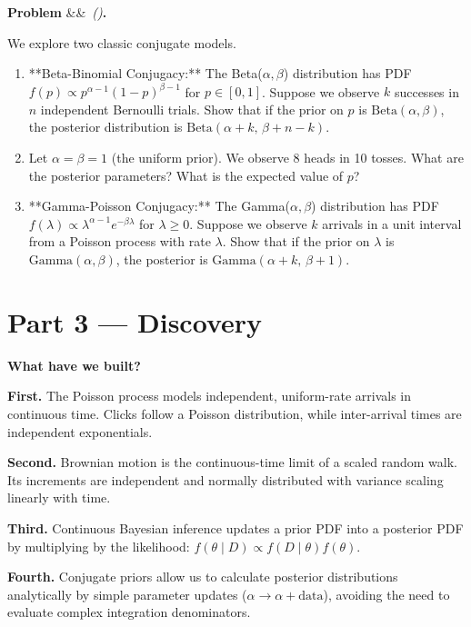 \documentclass[12pt, a4paper]{article}
\newcounter{problem}
\newenvironment{problem}[1][]{%
  \refstepcounter{problem}%
  \par\vspace{6pt}%
  \noindent\textbf{\color{MidBlue}Problem \theproblem}%
  \ifx&#1&\else\ \textit{(#1)}\fi\textbf{.}\enskip
}{\par\vspace{4pt}}
\begin{document}
\begin{problem}
\label{prob:conjugate_priors}
We explore two classic conjugate models.
\begin{enumerate}[label=(\alph*), topsep=2pt]
  \item **Beta-Binomial Conjugacy:** The Beta($\alpha, \beta$) distribution has PDF $f(p) \propto p^{\alpha-1}(1-p)^{\beta-1}$ for $p \in [0, 1]$.
  Suppose we observe $k$ successes in $n$ independent Bernoulli trials. Show that if the prior on $p$ is $\text{Beta}(\alpha, \beta)$, the posterior distribution is $\text{Beta}(\alpha + k, \, \beta + n - k)$.
  \item Let $\alpha = \beta = 1$ (the uniform prior). We observe 8 heads in 10 tosses. What are the posterior parameters? What is the expected value of $p$?
  \item **Gamma-Poisson Conjugacy:** The Gamma($\alpha, \beta$) distribution has PDF $f(\lambda) \propto \lambda^{\alpha-1} e^{-\beta \lambda}$ for $\lambda \ge 0$.
  Suppose we observe $k$ arrivals in a unit interval from a Poisson process with rate $\lambda$. Show that if the prior on $\lambda$ is $\text{Gamma}(\alpha, \beta)$, the posterior is $\text{Gamma}(\alpha + k, \, \beta + 1)$.
\end{enumerate}
\end{problem}

\newpage

\section{Part 3 \texorpdfstring{---}{--} Discovery}

\begin{discoverybox}
\textbf{What have we built?}

\textbf{First.} The Poisson process models independent, uniform-rate arrivals in continuous time. Clicks follow a Poisson distribution, while inter-arrival times are independent exponentials.

\textbf{Second.} Brownian motion is the continuous-time limit of a scaled random walk. Its increments are independent and normally distributed with variance scaling linearly with time.

\textbf{Third.} Continuous Bayesian inference updates a prior PDF into a posterior PDF by multiplying by the likelihood: $f(\theta \mid D) \propto f(D \mid \theta) f(\theta)$.

\textbf{Fourth.} Conjugate priors allow us to calculate posterior distributions analytically by simple parameter updates ($\alpha \to \alpha + \text{data}$), avoiding the need to evaluate complex integration denominators.
\end{discoverybox}
\end{document}

